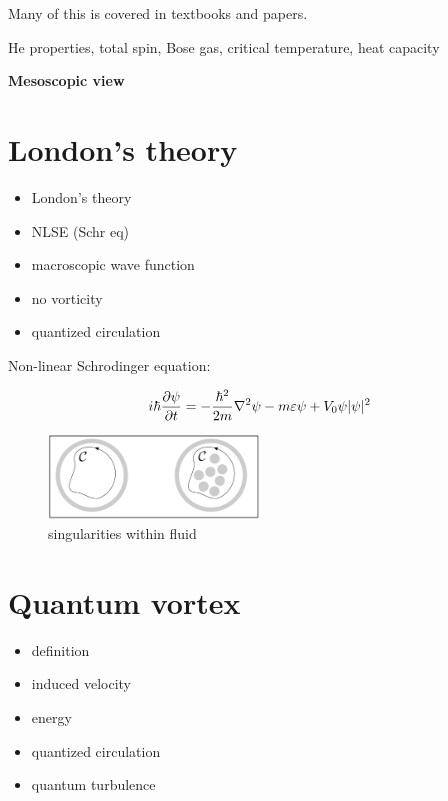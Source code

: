 Many of this is covered in textbooks and papers.

He properties, total spin, Bose gas, critical temperature, heat capacity

\newpage

{\Huge \bfseries Mesoscopic view}
\vspace{0.3cm}

\section{London's theory}
\begin{itemize}
	\item London's theory
	\item NLSE (Schr eq)
	\item macroscopic wave function
	\item no vorticity
	\item quantized circulation
\end{itemize}

Non-linear Schrodinger equation:

$$
i \hbar \frac{\partial \psi}{\partial t} = - \frac{\hbar^2}{2m} \nabla^2 \psi - m\varepsilon \psi + V_0 \psi \vert \psi \vert^2
$$

\begin{figure}[h]
	\centering
	\includegraphics[width=0.5\textwidth]{graphics/theory/singularity}
	\caption{singularities within fluid}
	\label{singularity}
\end{figure}

\section{Quantum vortex}
\begin{itemize}
	\item definition
	\item induced velocity
	\item energy
	\item quantized circulation
	\item quantum turbulence
\end{itemize}

